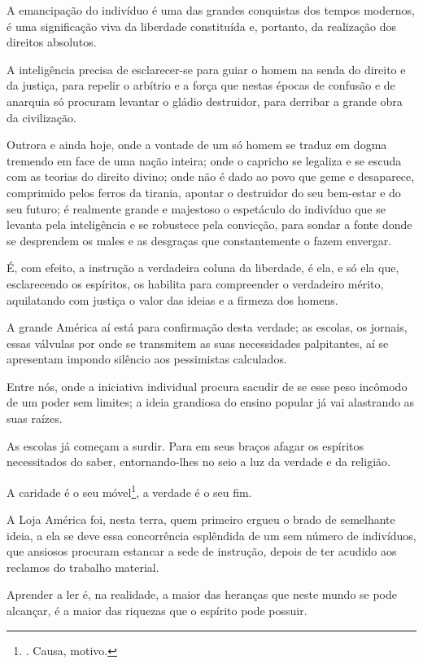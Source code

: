A emancipação do indivíduo é uma das grandes conquistas dos tempos
modernos, é uma significação viva da liberdade constituída e, portanto,
da realização dos direitos absolutos.

A inteligência precisa de esclarecer-se para guiar o homem na senda do
direito e da justiça, para repelir o arbítrio e a força que nestas
épocas de confusão e de anarquia só procuram levantar o gládio
destruidor, para derribar a grande obra da civilização.

Outrora e ainda hoje, onde a vontade de um só homem se traduz em dogma
tremendo em face de uma nação inteira; onde o capricho se legaliza e se
escuda com as teorias do direito divino; onde não é dado ao povo que
geme e desaparece, comprimido pelos ferros da tirania, apontar o
destruidor do seu bem-estar e do seu futuro; é realmente grande e
majestoso o espetáculo do indivíduo que se levanta pela inteligência e
se robustece pela convicção, para sondar a fonte donde se desprendem os
males e as desgraças que constantemente o fazem envergar.

É, com efeito, a instrução a verdadeira coluna da liberdade, é ela, e só
ela que, esclarecendo os espíritos, os habilita para compreender o
verdadeiro mérito, aquilatando com justiça o valor das ideias e a
firmeza dos homens.

A grande América aí está para confirmação desta verdade; as escolas, os
jornais, essas válvulas por onde se transmitem as suas necessidades
palpitantes, aí se apresentam impondo silêncio aos pessimistas
calculados.

Entre nós, onde a iniciativa individual procura sacudir de se esse peso
incômodo de um poder sem limites; a ideia grandiosa do ensino popular já
vai alastrando as suas raízes.

As escolas já começam a surdir. Para em seus braços afagar os espíritos
necessitados do saber, entornando-lhes no seio a luz da verdade e da
religião.

A caridade é o seu móvel\footnote{. Causa, motivo.}, a verdade é o seu
fim.

A Loja América foi, nesta terra, quem primeiro ergueu o brado de
semelhante ideia, a ela se deve essa concorrência esplêndida de um sem
número de indivíduos, que ansiosos procuram estancar a sede de
instrução, depois de ter acudido aos reclamos do trabalho material.

Aprender a ler é, na realidade, a maior das heranças que neste mundo se
pode alcançar, é a maior das riquezas que o espírito pode possuir.


